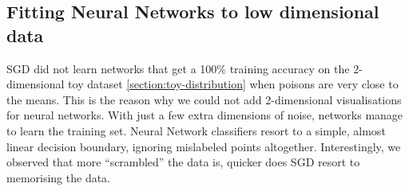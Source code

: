 \documentclass{ociamthesis}
\begin{document}
\begin{appendices}
    
\chapter{Fitting Neural Networks to low dimensional data}

SGD did not learn networks that get a 100\% training accuracy on the
2-dimensional toy dataset \ref{section:toy-distribution} when poisons are very
close to the means. This is the reason why we could not add 2-dimensional
visualisations for neural networks. With just a few extra dimensions of noise,
networks manage to learn the training set. Neural Network classifiers resort to
a simple, almost linear decision boundary, ignoring mislabeled points
altogether. Interestingly, we observed that more ``scrambled'' the data is,
quicker does SGD resort to memorising the data.


\end{appendices}
\end{document}
